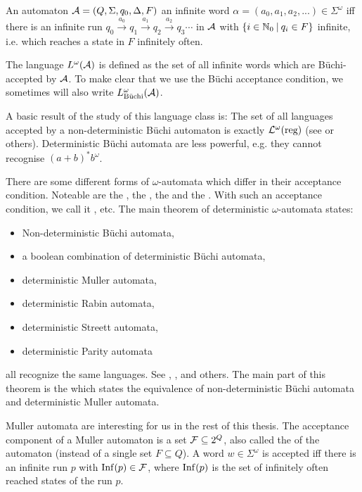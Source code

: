 An automaton $\mathcal{A} = (Q, \Sigma, q_0, \Delta, F)$  an infinite word $\alpha = (a_0,a_1,a_2,...) \in \Sigma^\omega$ iff there is an infinite run $q_0 \xrightarrow{a_0} q_1 \xrightarrow{a_1} q_2 \xrightarrow{a_2} q_3 \cdots$ in $\mathcal{A}$ with $\Set{ i \in \N_0 }{ q_i \in F }$ infinite, i.e. which reaches a state in $F$ infinitely often.

The language $L^\omega(\mathcal{A})$ is defined as the set of all infinite words which are Büchi-accepted by  $\mathcal{A}$. To make clear that we use the Büchi acceptance condition, we sometimes will also write $L^\omega_\text{Büchi}(\mathcal{A})$.

A basic result of the study of this language class is: The set of all languages accepted by a non-deterministic Büchi automaton is exactly $\mathcal{L}^\omega(\text{reg})$ (see \cite{InfCompR101} or others). %
Deterministic Büchi automata are less powerful, e.g. they cannot recognise $(a+b)^* b^\omega$.

There are some different forms of $\omega$-automata which differ in their acceptance condition. Noteable are the , the , the  and the . With such an acceptance condition, we call it , etc. The main theorem of deterministic $\omega$-automata states:
\begin{itemize}
\item Non-deterministic Büchi automata,
\item a boolean combination of deterministic Büchi automata,
\item deterministic Muller automata,
\item deterministic Rabin automata,
\item deterministic Streett automata,
\item deterministic Parity automata
\end{itemize}
all recognize the same languages. See \cite{InfCompR101}, \cite{LangAutLogicR102}, \cite{InfWordsR110} and others. The main part of this theorem is the  which states the equivalence of non-deterministic Büchi automata and deterministic Muller automata.

Muller automata are interesting for us in the rest of this thesis. The acceptance component of a Muller automaton is a set $\mathcal{F} \subseteq 2^Q$, also called the  of the automaton (instead of a single set $F \subseteq Q$). A word $w \in \Sigma^\omega$ is accepted iff there is an infinite run $p$ with $\operatorname{Inf}(p) \in \mathcal{F}$, where $\operatorname{Inf}(p)$ is the set of infinitely often reached states of the run $p$.


